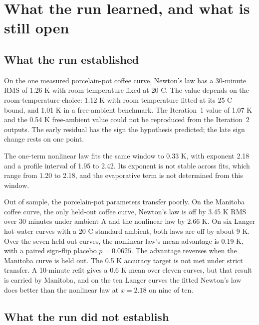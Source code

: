 \documentclass[11pt,letterpaper]{article}
\begin{document}
\section{What the run learned, and what is still open}

\subsection{What the run established}

On the one measured porcelain-pot coffee curve, Newton's law has a 30-minute RMS of 1.26 K with room temperature fixed at 20 C. The value depends on the room-temperature choice: 1.12 K with room temperature fitted at its 25 C bound, and 1.01 K in a free-ambient benchmark. The Iteration~1 value of 1.07 K and the 0.54 K free-ambient value could not be reproduced from the Iteration~2 outputs. The early residual has the sign the hypothesis predicted; the late sign change rests on one point.

The one-term nonlinear law fits the same window to 0.33 K, with exponent 2.18 and a profile interval of 1.95 to 2.42. Its exponent is not stable across fits, which range from 1.20 to 2.18, and the evaporative term is not determined from this window.

Out of sample, the porcelain-pot parameters transfer poorly. On the Manitoba coffee curve, the only held-out coffee curve, Newton's law is off by 3.45 K RMS over 30 minutes under ambient A and the nonlinear law by 2.66 K. On six Langer hot-water curves with a 20 C standard ambient, both laws are off by about 9 K. Over the seven held-out curves, the nonlinear law's mean advantage is 0.19 K, with a paired sign-flip placebo $p = 0.0625$. The advantage reverses when the Manitoba curve is held out. The 0.5 K accuracy target is not met under strict transfer. A 10-minute refit gives a 0.6 K mean over eleven curves, but that result is carried by Manitoba, and on the ten Langer curves the fitted Newton's law does better than the nonlinear law at $x = 2.18$ on nine of ten.

\subsection{What the run did not establish}
\end{document}
